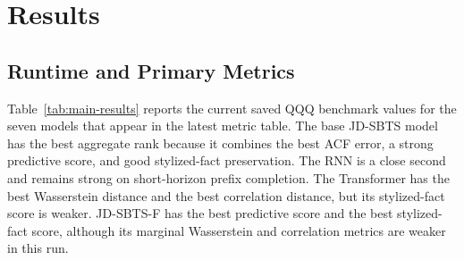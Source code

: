 \documentclass[11pt,a4paper]{article}
\begin{document}
\section{Results}

\subsection{Runtime and Primary Metrics}

Table~\ref{tab:main-results} reports the current saved QQQ benchmark values for
the seven models that appear in the latest metric table. The base JD-SBTS model
has the best aggregate rank because it combines the best ACF error, a strong
predictive score, and good stylized-fact preservation. The RNN is a close
second and remains strong on short-horizon prefix completion. The Transformer
has the best Wasserstein distance and the best correlation distance, but its
stylized-fact score is weaker. JD-SBTS-F has the best predictive score and the
best stylized-fact score, although its marginal Wasserstein and correlation
metrics are weaker in this run.

\begin{table}[H]
\centering
\caption{Main QQQ benchmark results. Lower is better for Wasserstein distance,
ACF MSE, predictive score, correlation distance, stylized score, and overall
rank score.}
\label{tab:main-results}
\end{table}
\end{document}
